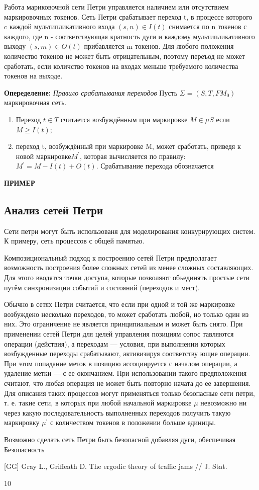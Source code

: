 \documentclass[a4paper,14pt]{article}
\begin{document}
Работа мариковочной сети Петри управляется наличием или отсутствием маркировочных токенов. Сеть Петри срабатывает  переход t, в процессе которого c каждой  мультипликативного входа $(s, n) \in I(t)$ снимается по n токенов с каждого, где n - соответствующая кратность дуги и каждому мультипликативного выходу $(s, m) \in O(t)$ прибавляется m токенов.
Для любого положения количество токенов не может быть отрицательным, поэтому переъод не может сработать, если количство токенов на входах меньше требуемого количества токенов на выходе. 

\textbf{Опеределение: } \textit{Правило срабатывания переходов}
Пусть $\Sigma = (S,T,F M_{0})$ маркировочная сеть.
\begin{enumerate}
\item Переход $t \in T$ считается возбуждённым при маркировке $M \in \mu S$ если $M \geq I(t)$;
\item переход t, возбуждённый при маркировке M,  может сработать, приведя к новой маркировке$M^{'}$,  которая вычисляется по правилу: $M^{'} = M - I(t) + O(t)$. Срабатывание перехода обозначается 
\end{enumerate}


\textbf{ПРИМЕР}

\subsection{Анализ сетей Петри}
Сети петри могут быть использованя для моделирования конкурирующих систем. К примеру, сеть процессов с общей памятью. 

\par Композициональный подход к построению сетей Петри предполагает возможность построения более сложных сетей из менее сложных составляющих. Для этого вводятся точки доступа, которые позволяют объединять простые сети путём синхронизации событий и состояний (переходов и мест).
\par Обычно в сетях Петри считается, что если при одной и той же маркировке возбуждено несколько переходов, то может сработать любой, но только один из них. Это ограничение не является принципиальным и может быть снято.
При применении сетей Петри для целей управления позициям сопос­
тавляются операции (действия), а переходам — условия, при выполнении
которых возбужденные переходы срабатывают, активизируя соответству­ ющие операции. При этом попадание меток в позицию ассоциируется с началом операции, а удаление метки — с ее окончанием. При использовании такого предположения считают, что любая операция не может быть повторно начата до ее завершения. Для описания таких процессов могут применяться только безопасные сети петри, т. е. такие сети, в которых при любой начальной маркировке $\mu$ невозможно ни через какую последовательность выполненных переходов получить такую маркировку $\mu^{'}$ с количеством токенов в положении больше единицы.
\par Возможно сделать сеть Петри быть безопасной добавляя дуги, обеспечивая 
Безопасность 







\begin{thebibliography}{10}
[GG] Gray L., Griffeath D. The ergodic theory of traffic jams // J. Stat. 
\end{thebibliography}{10}
\end{document}
